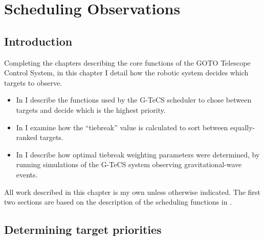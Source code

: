 
\chapter{Scheduling Observations}
\label{chap:scheduling}


\chaptoc{}


\section{Introduction}
\label{sec:scheduling_intro}


\begin{colsection}

Completing the chapters describing the core functions of the GOTO Telescope Control System, in this chapter I detail how the robotic system decides which targets to observe.
%
\begin{itemize}
    \item In  I describe the functions used by the G\nobreakdash-TeCS scheduler to chose between targets and decide which is the highest priority.
    \item In  I examine how the ``tiebreak'' value is calculated to sort between equally-ranked targets.
    \item In  I describe how optimal tiebreak weighting parameters were determined, by running simulations of the G-TeCS system observing gravitational-wave events.
\end{itemize}
%
All work described in this chapter is my own unless otherwise indicated. The first two sections are based on the description of the scheduling functions in \citet{Dyer}.

\end{colsection}


\section{Determining target priorities}
\label{sec:ranking}


